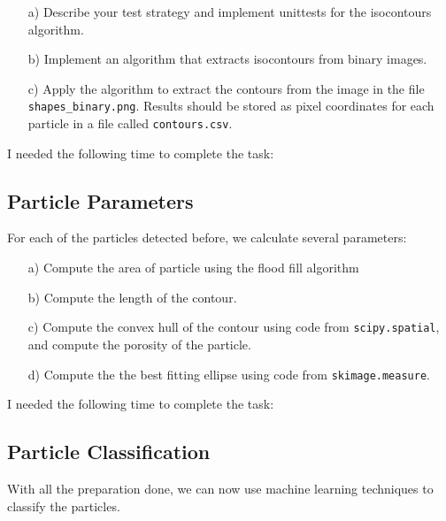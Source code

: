 \begin{enumerate}

\item[a)] Describe your test strategy and implement unittests for the isocontours algorithm.

\item[b)] Implement an algorithm that extracts isocontours from binary images. 

\item[c)] Apply the algorithm to extract the contours from the image in the file \texttt{shapes\_binary.png}. Results should be stored as pixel coordinates for each particle in a file called \texttt{contours.csv}.

\end{enumerate}

I needed the following time to complete the task:

\subsection{Particle Parameters}

For each of the particles detected before, we calculate several parameters:

\begin{enumerate}

\item[a)] Compute the area of particle using the flood fill algorithm

\item[b)] Compute the length of the contour.

\item[c)] Compute the convex hull of the contour using code from \texttt{scipy.spatial}, and compute the porosity of the particle.

\item[d)] Compute the the best fitting ellipse using code from \texttt{skimage.measure}.

\end{enumerate}

I needed the following time to complete the task:

\subsection{Particle Classification}

With all the preparation done, we can now use machine learning techniques to classify the particles. 

